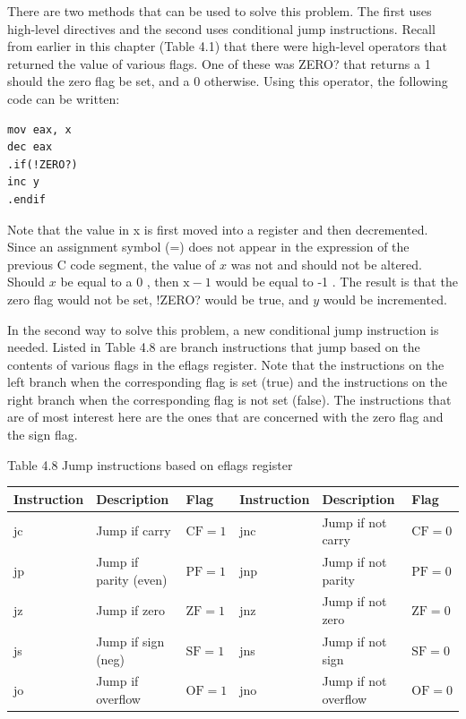 \documentclass[10pt]{article}
\begin{document}
There are two methods that can be used to solve this problem. The first uses high-level directives and the second uses conditional jump instructions. Recall from earlier in this chapter (Table 4.1) that there were high-level operators that returned the value of various flags. One of these was ZERO? that returns a 1 should the zero flag be set, and a 0 otherwise. Using this operator, the following code can be written:

\begin{verbatim}
mov eax, x
dec eax
.if(!ZERO?)
inc y
.endif
\end{verbatim}

Note that the value in x is first moved into a register and then decremented. Since an assignment symbol (=) does not appear in the expression of the previous C code segment, the value of $x$ was not and should not be altered. Should $x$ be equal to a 0 , then $\mathrm{x}-1$ would be equal to -1 . The result is that the zero flag would not be set, !ZERO? would be true, and $y$ would be incremented.

In the second way to solve this problem, a new conditional jump instruction is needed. Listed in Table 4.8 are branch instructions that jump based on the contents of various flags in the eflags register. Note that the instructions on the left branch when the corresponding flag is set (true) and the instructions on the right branch when the corresponding flag is not set (false). The instructions that are of most interest here are the ones that are concerned with the zero flag and the sign flag.

Table 4.8 Jump instructions based on eflags register

\begin{center}
\begin{tabular}{|l|l|l|l|l|l|}
\hline
Instruction & Description & Flag & Instruction & Description & Flag \\
\hline
jc & Jump if carry & $\mathrm{CF}=1$ & jnc & Jump if not carry & $\mathrm{CF}=0$ \\
\hline
jp & Jump if parity (even) & $\mathrm{PF}=1$ & jnp & Jump if not parity & $\mathrm{PF}=0$ \\
\hline
jz & Jump if zero & $\mathrm{ZF}=1$ & jnz & Jump if not zero & $\mathrm{ZF}=0$ \\
\hline
js & Jump if sign (neg) & $\mathrm{SF}=1$ & jns & Jump if not sign & $\mathrm{SF}=0$ \\
\hline
jo & Jump if overflow & $\mathrm{OF}=1$ & jno & Jump if not overflow & $\mathrm{OF}=0$ \\
\hline
\end{tabular}
\end{center}
\end{document}
